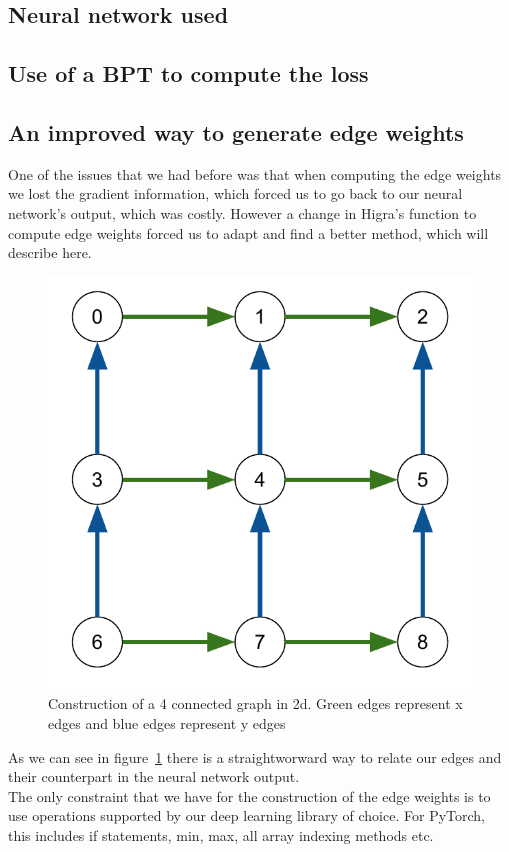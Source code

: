\subsection{Neural network used}



\subsection{Use of a BPT to compute the loss}


\subsection{An improved way to generate edge weights}

One of the issues that we had before was that when computing the edge weights we lost the gradient
information, which forced us to go back to our neural network's output, which was costly.
However a change in Higra's function to compute edge weights forced us to adapt and find a better
method, which will describe here.\\

\begin{figure}[!htbp]
	\centering
	\includegraphics[width=0.5\linewidth]{./images/graph.pdf}
	\caption{Construction of a 4 connected graph in 2d. Green edges represent x
	edges and blue edges represent y edges}%
	\label{fig:graph}
\end{figure}

As we can see in figure~\ref{fig:graph} there is a straightworward way to
relate our edges and their counterpart in the neural network output.\\

The only constraint that we have for the construction of the edge weights is to
use operations supported by our deep learning library of choice. For PyTorch, this
includes if statements, min, max, all array indexing methods etc.

